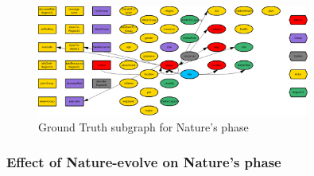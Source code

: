 \documentclass{article}%
\begin{document}
\begin{figure}[ht]%
\centering%
\includegraphics[width=0.8\textwidth]{images/phaseOfNature.png}%
\caption{Ground Truth subgraph for Nature's phase}%
\end{figure}

%
\subsubsection{Effect of Nature{-}evolve on Nature's phase}%
\label{ssubsec:Effect of Nature{-}evolve on Nature's phase}%
\end{document}
